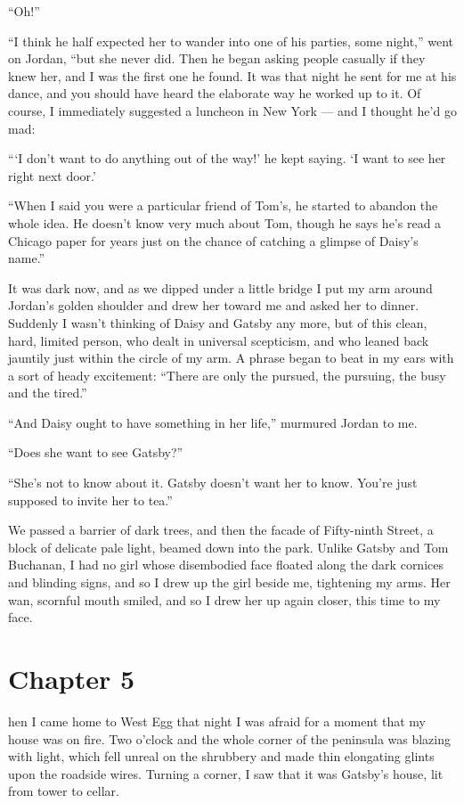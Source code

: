 \documentclass{znotebook}
\begin{document}
``Oh!''

``I think he half expected her to wander into one of his parties, some night,'' went on Jordan, ``but she never did. Then he began asking people casually if they knew her, and I was the first one he found. It was that night he sent for me at his dance, and you should have heard the elaborate way he worked up to it. Of course, I immediately suggested a luncheon in New York ---{} and I thought he'd go mad:

``‘I don't want to do anything out of the way!' he kept saying. ‘I want to see her right next door.'

``When I said you were a particular friend of Tom's, he started to abandon the whole idea. He doesn't know very much about Tom, though he says he's read a Chicago paper for years just on the chance of catching a glimpse of Daisy's name.''

It was dark now, and as we dipped under a little bridge I put my arm around Jordan's golden shoulder and drew her toward me and asked her to dinner. Suddenly I wasn't thinking of Daisy and Gatsby any more, but of this clean, hard, limited person, who dealt in universal scepticism, and who leaned back jauntily just within the circle of my arm. A phrase began to beat in my ears with a sort of heady excitement: ``There are only the pursued, the pursuing, the busy and the tired.''

``And Daisy ought to have something in her life,'' murmured Jordan to me.

``Does she want to see Gatsby?''

``She's not to know about it. Gatsby doesn't want her to know. You're just supposed to invite her to tea.''

We passed a barrier of dark trees, and then the facade of Fifty-ninth Street, a block of delicate pale light, beamed down into the park. Unlike Gatsby and Tom Buchanan, I had no girl whose disembodied face floated along the dark cornices and blinding signs, and so I drew up the girl beside me, tightening my arms. Her wan, scornful mouth smiled, and so I drew her up again closer, this time to my face.

\chapter{Chapter 5}

\lettrine[findent=2pt]{}{ }hen I came home to West Egg that night I was afraid for a moment that my house was on fire. Two o'clock and the whole corner of the peninsula was blazing with light, which fell unreal on the shrubbery and made thin elongating glints upon the roadside wires. Turning a corner, I saw that it was Gatsby's house, lit from tower to cellar.
\end{document}
